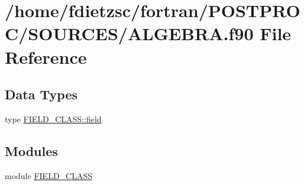 \hypertarget{ALGEBRA_8f90}{
\section{/home/fdietzsc/fortran/POSTPROC/SOURCES/ALGEBRA.f90 File Reference}
\label{ALGEBRA_8f90}
}
\subsection*{Data Types}
\begin{DoxyCompactItemize}
\item 
type \hyperlink{typeFIELD__CLASS_1_1field}{FIELD\_\-CLASS::field}
\end{DoxyCompactItemize}
\subsection*{Modules}
\begin{DoxyCompactItemize}
\item 
module \hyperlink{namespaceFIELD__CLASS}{FIELD\_\-CLASS}
\end{DoxyCompactItemize}

